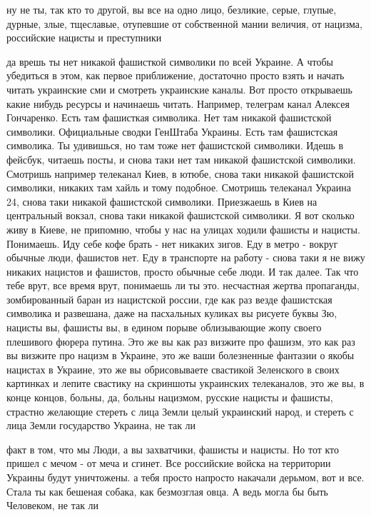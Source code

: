 ну не ты, так кто то другой, вы все на одно лицо, безликие, серые, глупые,
дурные, злые, тщеславые, отупевшие от собственной мании величия, от нацизма,
российские нацисты и преступники

да врешь ты нет никакой фашисткой символики по всей Украине. А чтобы убедиться
в этом, как первое приближение, достаточно просто взять и начать читать
украинские сми и смотреть украинские каналы. Вот просто открываешь какие нибудь
ресурсы и начинаешь читать. Например, телеграм канал Алексея Гончаренко. Есть
там фашисткая символика. Нет там никакой фашистской символики. Официальные
сводки ГенШтаба Украины. Есть там фашистская символика. Ты удивишься, но там
тоже нет фашистской символики. Идешь в фейсбук, читаешь посты, и снова таки нет
там никакой фашистской символики. Смотришь например телеканал Киев, в ютюбе,
снова таки никакой фашистской символики, никаких там хайль и тому подобное.
Смотришь телеканал Украина 24, снова таки никакой фашистской символики.
Приезжаешь в Киев на центральный вокзал, снова таки никакой фашистской
символики. Я вот сколько живу в Киеве, не припомню, чтобы у нас на улицах
ходили фашисты и нацисты. Понимаешь.  Иду себе кофе брать - нет никаких зигов.
Еду в метро - вокруг обычные люди, фашистов нет.  Еду в транспорте на работу -
снова таки я не вижу никаких нацистов и фашистов, просто обычные себе люди.  И
так далее. Так что тебе врут, все время врут, понимаешь ли ты это.  несчастная
жертва пропаганды, зомбированный баран из нацистской россии, где как раз везде
фашистская символика и развешана, даже на пасхальных куликах вы рисуете буквы
Зю, нацисты вы, фашисты вы, в едином порыве облизывающие жопу своего плешивого
фюрера путина. Это же вы как раз визжите про фашизм, это как раз вы визжите про
нацизм в Украине, это же ваши болезненные фантазии о якобы нацистах в Украине,
это же вы обрисовываете свастикой Зеленского в своих картинках и лепите
свастику на скриншоты украинских телеканалов, это же вы, в конце концов,
больны, да, больны нацизмом, русские нацисты и фашисты, страстно желающие
стереть с лица Земли целый украинский народ, и стереть с лица Земли государство
Украина, не так ли

факт в том, что мы Люди, а вы захватчики, фашисты и нацисты. Но тот кто пришел
с мечом - от меча и сгинет. Все российские войска на территории Украины будут
уничтожены.  
а тебя просто напросто накачали дерьмом, вот и все. Стала ты как бешеная
собака, как безмозглая овца. А ведь могла бы быть Человеком, не так ли 

